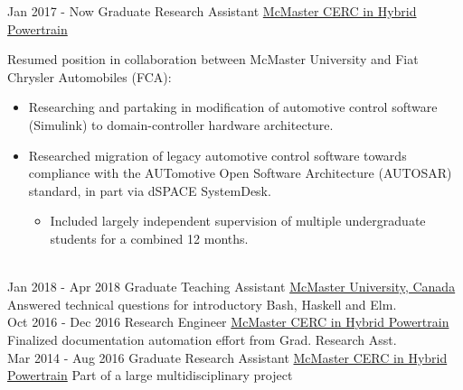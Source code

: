 \documentclass[letterpaper]{twentysecondcv} %
\begin{document}
\begin{twenty} %
  \twentyitem
  {Jan 2017 -}
  {Now}
  {Graduate Research Assistant}
  {%
    \href{http://hybrid.mcmaster.ca/}{McMaster CERC in Hybrid Powertrain}}
  {}
  {Resumed position in collaboration between McMaster University and Fiat Chrysler Automobiles (FCA):\begin{itemize}
      \item Researching and partaking in modification of automotive control software (Simulink) to domain-controller hardware architecture.
			\item Researched migration of legacy automotive control software towards compliance with the AUTomotive Open Software Architecture (AUTOSAR) standard, in part via dSPACE SystemDesk.
      \begin{itemize}
        \item Included largely independent supervision of multiple undergraduate students for a combined 12 months.
      \end{itemize}
	\end{itemize}}
	\\
  \twentyitem
  {Jan 2018 -}
  {Apr 2018}
  {Graduate Teaching Assistant}
  {\href{https://www.mcmaster.ca/}{McMaster University, Canada}}
  {}
  {Answered technical questions for introductory Bash, Haskell and Elm.
}
  \\
	\twentyitem
	{Oct 2016 -}
	{Dec 2016}
	{Research Engineer}
	{\href{http://hybrid.mcmaster.ca/}{McMaster CERC in Hybrid Powertrain}}
	{}
	{Finalized documentation automation effort from Grad. Research Asst.
}
	\\
  \twentyitem
	{Mar 2014 -}
	{Aug 2016}
	{Graduate Research Assistant}
	{\href{http://hybrid.mcmaster.ca/}{McMaster CERC in Hybrid Powertrain}}
	{}
	{Part of a large multidisciplinary project
}
\end{twenty}
\end{document}
